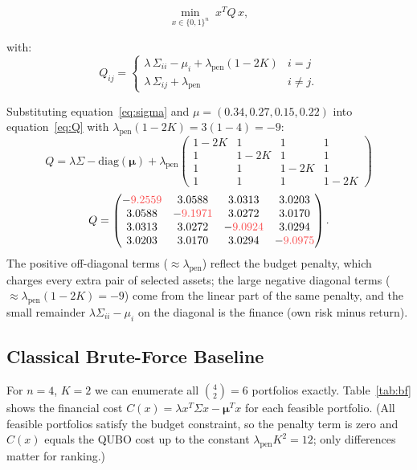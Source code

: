 \documentclass[a4paper,11pt]{article}
\newcommand{\crd}[1]{\textcolor{ibmred}{#1}}
\begin{document}
\begin{equation}
    \min_{x\in\{0,1\}^n}\; x^T Q\, x,
    \label{eq:qubo}
\end{equation}

\noindent with:
\begin{equation}
    Q_{ij} = \begin{cases}
        \lambda\,\Sigma_{ii} - \mu_i + \lambda_\text{pen}(1-2K)
        & i = j \\[4pt]
        \lambda\,\Sigma_{ij} + \lambda_\text{pen}
        & i \neq j.
    \end{cases}
    \label{eq:Q}
\end{equation}

\begin{mathbox}[QUBO Matrix for $n=4$, $K=2$, $\lambda=1$, $\lambda_\text{pen}=3$]
Substituting equation~\eqref{eq:sigma} and $\mu = (0.34, 0.27, 0.15, 0.22)$
into equation~\eqref{eq:Q} with $\lambda_\text{pen}(1-2K) = 3(1-4) = -9$:
\[
    Q = \lambda\Sigma - \mathrm{diag}(\boldsymbol\mu)
    + \lambda_\text{pen}
    \begin{pmatrix}
        1-2K & 1 & 1 & 1 \\
        1 & 1-2K & 1 & 1 \\
        1 & 1 & 1-2K & 1 \\
        1 & 1 & 1 & 1-2K
    \end{pmatrix}
\]
\[
    Q = \begin{pmatrix}
        -\crd{9.2559} & 3.0588 & 3.0313 & 3.0203 \\
        3.0588 & -\crd{9.1971} & 3.0272 & 3.0170 \\
        3.0313 & 3.0272 & -\crd{9.0924} & 3.0294 \\
        3.0203 & 3.0170 & 3.0294 & -\crd{9.0975}
    \end{pmatrix}.
\]
The positive off-diagonal terms ($\approx\lambda_\text{pen}$) reflect the budget
penalty, which charges every extra pair of selected assets;
the large negative diagonal terms ($\approx\lambda_\text{pen}(1-2K) = -9$) come from the
linear part of the same penalty, and the small remainder $\lambda\Sigma_{ii} - \mu_i$ on
the diagonal is the finance (own risk minus return).
\end{mathbox}

\subsection{Classical Brute-Force Baseline}

For $n=4$, $K=2$ we can enumerate all $\binom{4}{2}=6$ portfolios
exactly. Table~\ref{tab:bf} shows the financial cost
$C(x)=\lambda x^T\Sigma x - \boldsymbol\mu^T x$ for each feasible
portfolio. (All feasible portfolios satisfy the budget constraint, so the
penalty term is zero and $C(x)$ equals the QUBO cost up to the constant
$\lambda_\text{pen}K^2=12$; only differences matter for ranking.)
\end{document}
